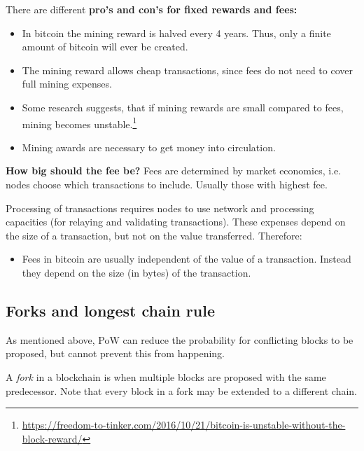 \begin{note} There are different \textbf{pro's and con's for fixed rewards and fees:}
	\begin{itemize}
		\item In bitcoin the mining reward is halved every 4 years. Thus, only a finite amount of bitcoin will ever be created.
		\item The mining reward allows cheap transactions, since fees do not need to cover full mining expenses.
		\item Some research suggests, that if mining rewards are small compared to fees, mining becomes unstable.\footnote{\url{https://freedom-to-tinker.com/2016/10/21/bitcoin-is-unstable-without-the-block-reward/}}
		\item Mining awards are necessary to get money into circulation.
	\end{itemize}
\end{note}


\begin{note} \textbf{How big should the fee be?}
Fees are determined by market economics, i.e. nodes choose which transactions to include. Usually those with highest fee.
	
Processing of transactions requires nodes to use network and processing capacities (for relaying and validating transactions). These expenses depend on the size of a transaction, but not on the value transferred. Therefore:
\begin{itemize}
	\item Fees in bitcoin are usually independent of the value of a transaction. Instead they depend on the size (in bytes) of the transaction.
\end{itemize}
\end{note}

\subsection{Forks and longest chain rule}
As mentioned above, PoW can reduce the probability for conflicting blocks to be proposed, but cannot prevent this from happening.

\begin{definition} A \emph{fork} in a blockchain is when multiple blocks are proposed with the same predecessor. Note that every block in a fork may be extended to a different chain.
\end{definition}

